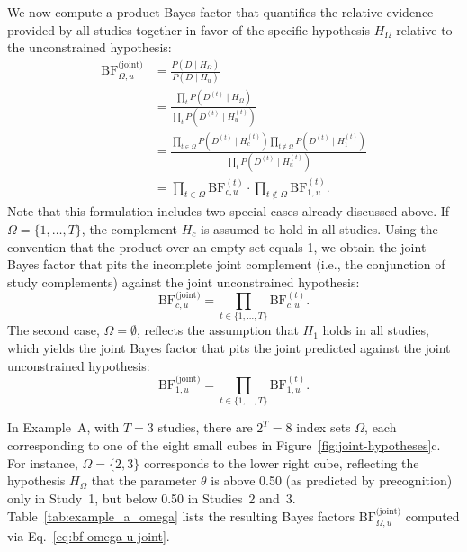 \documentclass[letterpaper,11pt,oneside]{article}
\begin{document}
We now compute a product Bayes factor that quantifies the relative evidence provided by all studies together in favor of the specific hypothesis $H_\Omega$ relative to the unconstrained hypothesis:
\begin{align}
\mathrm{BF}_{\Omega,u}^{\text{(joint)}}
&= \frac{P\left(D \mid H_{\Omega}\right)}
        {P\left(D \mid H_u\right)} \nonumber \\
&= \frac{\prod_{t} P\left(D^{(t)} \mid H_{\Omega}\right)}
        {\prod_{t} P\left(D^{(t)} \mid H_u^{(t)}\right)} \nonumber \\
&= \frac{\prod_{t \in \Omega} P\left(D^{(t)} \mid H_c^{(t)}\right)
         \prod_{t \notin \Omega} P\left(D^{(t)} \mid H_1^{(t)}\right)}
        {\prod_{t} P\left(D^{(t)} \mid H_u^{(t)}\right)} \nonumber \\
&= \prod_{t \in \Omega} \mathrm{BF}_{c,u}^{(t)} \cdot \prod_{t \notin \Omega} \mathrm{BF}_{1,u}^{(t)}.
\label{eq:bf-omega-u-joint}
\end{align}
Note that this formulation includes two special cases already discussed above. If $\Omega = \{1,\dots,T\}$, the complement $H_c$ is assumed to hold in all studies. Using the convention that the product over an empty set equals 1, we obtain the joint Bayes factor that pits the incomplete joint complement (i.e., the conjunction of study complements) against the joint unconstrained hypothesis:
$$
\mathrm{BF}_{c,u}^{\text{(joint)}} = \prod_{t \in \{1,\dots,T\}} \mathrm{BF}_{c,u}^{(t)}.
$$
The second case, $\Omega = \emptyset$, reflects the assumption that $H_1$ holds in all studies, which yields the joint Bayes factor that pits the joint predicted against the joint unconstrained hypothesis:
$$
\mathrm{BF}_{1,u}^{\text{(joint)}} = \prod_{t \in \{1,\dots,T\}} \mathrm{BF}_{1,u}^{(t)}.
$$

In Example~A, with $T = 3$ studies, there are $2^T = 8$ index sets $\Omega$, each corresponding to one of the eight small cubes in Figure~\ref{fig:joint-hypotheses}c. 
For instance, $\Omega = \{2,3\}$ corresponds to the lower right cube, reflecting the hypothesis $H_{{\Omega}}$ that the parameter $\theta$ is above 0.50 (as predicted by precognition) only in Study~1, but below 0.50 in Studies~2 and~3.
Table~\ref{tab:example_a_omega} lists the resulting Bayes factors $\mathrm{BF}_{\Omega,u}^{\text{(joint)}}$ computed via Eq.~\eqref{eq:bf-omega-u-joint}.
\end{document}

